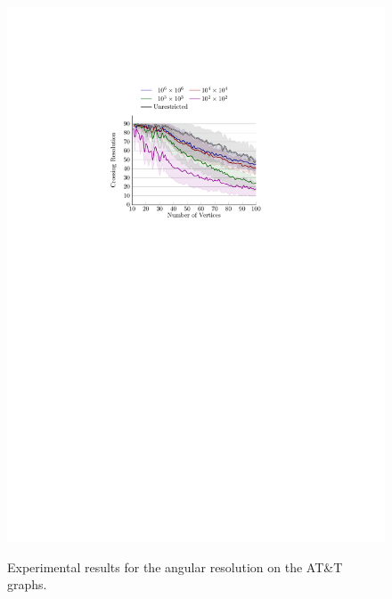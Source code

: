 \documentclass{comjnl}
\begin{document}
\begin{figure}[t!]
{	\includegraphics[scale=0.99,page=4]{figures/grid_colored}}
	\caption{Experimental results for the angular resolution on the AT\&T graphs.}
	\label{fig:experimentsGrid}
\end{figure}
\end{document}
